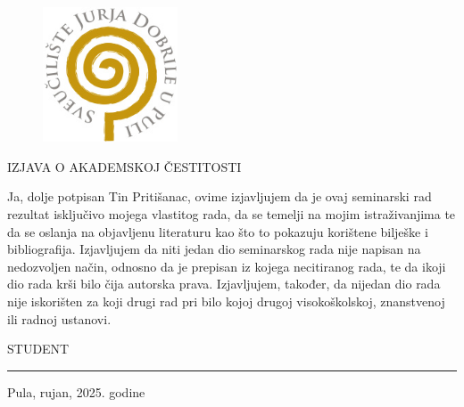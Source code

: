 \begin{center}
    \begin{figure}[H]
        \centering
        \includegraphics[width=4cm]{slike/uni-logo.jpg}
    \end{figure}

    \vspace{45mm}

    IZJAVA O AKADEMSKOJ ČESTITOSTI

    \vspace{20mm}

    \begin{flushleft}
        Ja, dolje potpisan Tin Pritišanac, ovime izjavljujem da je ovaj seminarski rad rezultat isključivo
        mojega vlastitog rada, da se temelji na mojim istraživanjima te da se oslanja na objavljenu
        literaturu kao što to pokazuju korištene bilješke i bibliografija. Izjavljujem da niti jedan dio
        seminarskog rada nije napisan na nedozvoljen način, odnosno da je prepisan iz kojega
        necitiranog rada, te da ikoji dio rada krši bilo čija autorska prava. Izjavljujem, također, da
        nijedan dio rada nije iskorišten za koji drugi rad pri bilo kojoj drugoj visokoškolskoj,
        znanstvenoj ili radnoj ustanovi.
    \end{flushleft}

    \vspace{20mm}
    \begin{flushright}
        STUDENT~~~~~~~~~~~~~~~ \\
        \bigskip
        \bigskip
        \rule{4cm}{0.4pt}
    \end{flushright}

    \vspace{30mm}

    Pula, rujan, 2025. godine
\end{center}
